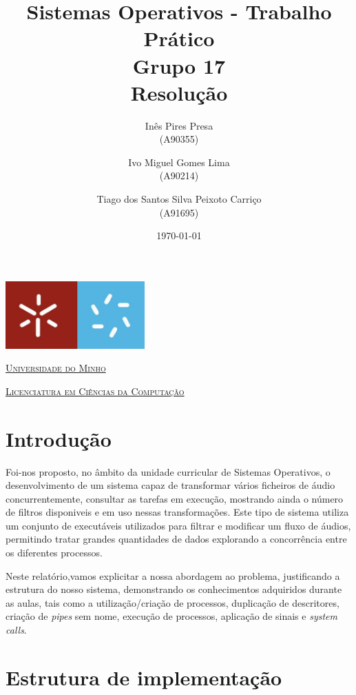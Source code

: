 \documentclass[11pt,a4paper]{report}
\title{Sistemas Operativos - Trabalho Prático\\
       \textbf{Grupo 17}\\ Resolução
       } %
\author{Inês Pires Presa\\ (A90355)\and Ivo Miguel Gomes Lima\\ (A90214)\and Tiago dos Santos Silva Peixoto Carriço \\ (A91695)
       } %
\date{\today} %
\begin{document}
	\begin{minipage}{0.9\linewidth}
        \centering
		\includegraphics[width=0.4\textwidth]{um.jpeg}\par\vspace{1cm}
                \href{https://www.uminho.pt/PT}
		{\scshape\LARGE Universidade do Minho} \par
		\vspace{0.6cm}
                \href{https://lcc.di.uminho.pt}
		{\scshape\Large Licenciatura em Ciências da Computação} \par
		\maketitle
	\end{minipage}


\tableofcontents %

\chapter{Introdução}

Foi-nos proposto, no âmbito da unidade curricular de Sistemas Operativos, o desenvolvimento de um sistema capaz de transformar vários ficheiros de áudio concurrentemente, consultar as tarefas em execução, mostrando ainda o número de filtros disponiveis e em uso nessas transformações. Este tipo de
sistema utiliza um conjunto de executáveis utilizados para filtrar e modificar um fluxo de áudios, permitindo tratar grandes quantidades de dados explorando a
concorrência entre os diferentes processos.

Neste relatório,vamos explicitar a nossa abordagem ao problema, justificando a estrutura do nosso sistema, demonstrando os
conhecimentos adquiridos durante as aulas, tais como a utilização/criação de processos, duplicação de descritores, criação de \emph{pipes} sem nome, execução de processos, aplicação de sinais e  \emph{system calls}.

\chapter{Estrutura de implementação}
\end{document}
